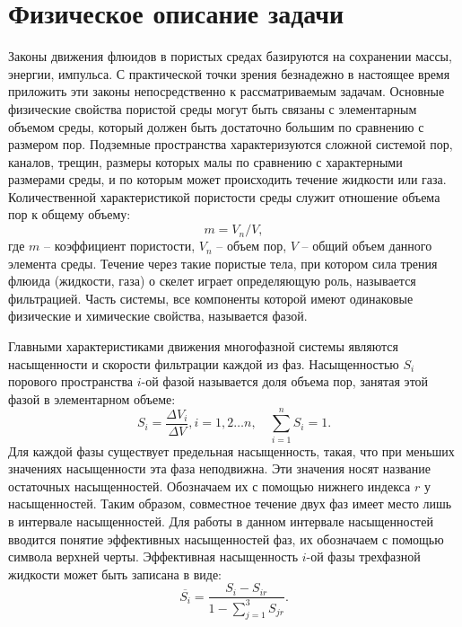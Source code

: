 %
\section{Физическое описание задачи}
%
%
	Законы движения флюидов в пористых средах базируются на сохранении
массы, энергии, импульса. С практической точки зрения безнадежно в настоящее
время приложить эти законы непосредственно к рассматриваемым задачам. Основные
физические свойства пористой среды могут быть связаны с элементарным
объемом среды, который должен быть достаточно большим по сравнению с размером
пор. Подземные пространства характеризуются сложной системой пор, каналов,
трещин, размеры которых малы по сравнению с характерными размерами среды, и по
которым может происходить течение жидкости или газа. Количественной
характеристикой пористости среды
служит отношение объема пор к общему объему:
%
	$$m=V_n/V,$$
%	 	
где $m$ -- коэффициент пористости, $V_n$ -- объем пор, $V$ -- общий объем
данного
элемента среды.
%
Течение через такие пористые тела, при котором сила трения флюида
(жидкости, газа) о скелет играет определяющую роль, называется фильтрацией.
Часть системы, все компоненты которой имеют
одинаковые физические и химические свойства, называется фазой. 

Главными характеристиками движения многофазной системы являются насыщенности и
скорости фильтрации каждой из фаз. Насыщенностью $S_i$  порового пространства
$i$-ой фазой называется доля объема пор, занятая этой фазой в элементарном
объеме:
%
\begin{equation} 
S_i=\frac{\Delta V_i}{\Delta V}, i=1,2\ldots n,{\quad}\sum_{i=1}^{n}S_i=1. 
\end{equation}
%
Для каждой фазы существует предельная насыщенность, такая, что при меньших
значениях насыщенности эта фаза неподвижна. Эти значения носят название остаточных 
насыщенностей. Обозначаем их с помощью нижнего индекса $r$ у насыщенностей. Таким 
образом, совместное течение двух фаз имеет место лишь в интервале насыщенностей.
Для работы в данном интервале насыщенностей вводится понятие эффективных 
насыщенностей фаз, их обозначаем с помощью символа верхней черты. Эффективная насыщенность 
$i$-ой фазы трехфазной жидкости может быть записана в виде:
$$\overline{S_i}={\frac{S_i-S_{ir}}{1-\sum\limits_{j=1}^{3}S_{jr}}}.$$

